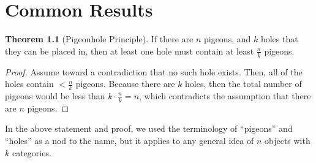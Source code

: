 \documentclass{scrippsthesisclass}
\theoremstyle{definition}
\newtheorem{theorem}{Theorem}[section]
\begin{document}
\chapter{Common Results}

\begin{theorem}[Pigeonhole Principle]
    If there are $n$ pigeons, and $k$ holes that they can be placed in, then at least one hole must contain at least $\frac{n}{k}$ pigeons. 
\end{theorem}
\begin{proof}
    Assume toward a contradiction that no such hole exists. 
    Then, all of the holes contain $< \frac{n}{k}$ pigeons.
    Because there are $k$ holes, then the total number of pigeons would be less than $k \cdot \frac{n}{k} = n$, which contradicts the assumption that there are $n$ pigeons.
\end{proof}
In the above statement and proof, we used the terminology of ``pigeons'' and ``holes'' as a nod to the name, but it applies to any general idea of $n$ objects with $k$ categories. 
\end{document}
